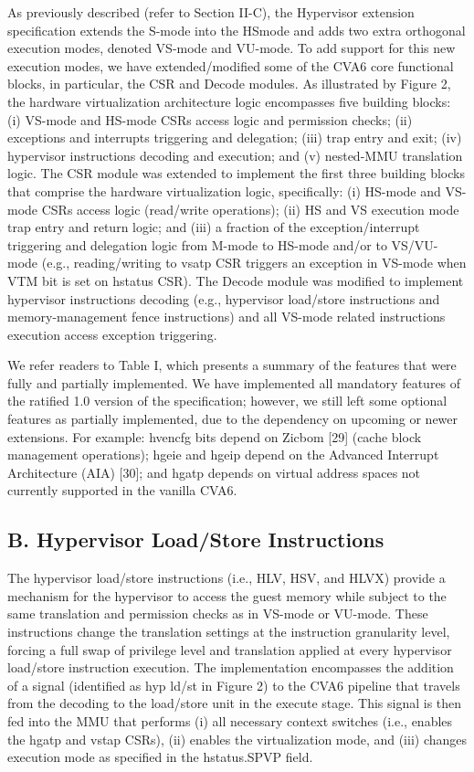 As previously described (refer to Section II-C), the Hypervisor extension specification extends the S-mode into the HSmode and adds two extra orthogonal execution modes, denoted
VS-mode and VU-mode. To add support for this new execution
modes, we have extended/modified some of the CVA6 core
functional blocks, in particular, the CSR and Decode modules.
As illustrated by Figure 2, the hardware virtualization architecture logic encompasses five building blocks: (i) VS-mode
and HS-mode CSRs access logic and permission checks; (ii)
exceptions and interrupts triggering and delegation; (iii) trap
entry and exit; (iv) hypervisor instructions decoding and execution; and (v) nested-MMU translation logic. The CSR module was extended to implement the first three building blocks
that comprise the hardware virtualization logic, specifically:
(i) HS-mode and VS-mode CSRs access logic (read/write
operations); (ii) HS and VS execution mode trap entry and
return logic; and (iii) a fraction of the exception/interrupt
triggering and delegation logic from M-mode to HS-mode
and/or to VS/VU-mode (e.g., reading/writing to vsatp CSR
triggers an exception in VS-mode when VTM bit is set on
hstatus CSR). The Decode module was modified to implement
hypervisor instructions decoding (e.g., hypervisor load/store
instructions and memory-management fence instructions) and
all VS-mode related instructions execution access exception
triggering.

We refer readers to Table I, which presents a summary
of the features that were fully and partially implemented.
We have implemented all mandatory features of the ratified
1.0 version of the specification; however, we still left some
optional features as partially implemented, due to the dependency on upcoming or newer extensions. For example:
hvencfg bits depend on Zicbom [29] (cache block management
operations); hgeie and hgeip depend on the Advanced Interrupt
Architecture (AIA) [30]; and hgatp depends on virtual address
spaces not currently supported in the vanilla CVA6.

\subsection*{B. Hypervisor Load/Store Instructions}

The hypervisor load/store instructions (i.e., HLV, HSV, and
HLVX) provide a mechanism for the hypervisor to access
the guest memory while subject to the same translation and
permission checks as in VS-mode or VU-mode. These instructions change the translation settings at the instruction
granularity level, forcing a full swap of privilege level and
translation applied at every hypervisor load/store instruction
execution. The implementation encompasses the addition of
a signal (identified as hyp ld/st in Figure 2) to the CVA6
pipeline that travels from the decoding to the load/store unit
in the execute stage. This signal is then fed into the MMU
that performs (i) all necessary context switches (i.e., enables
the hgatp and vstap CSRs), (ii) enables the virtualization
mode, and (iii) changes execution mode as specified in the
hstatus.SPVP field.

